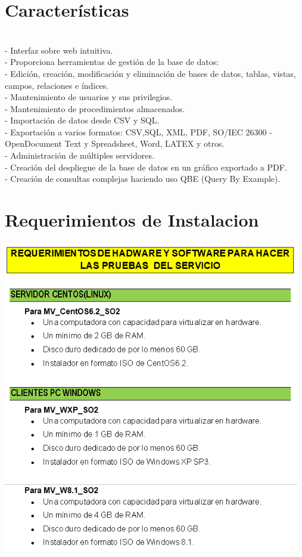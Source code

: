 \section{Características} 
\begin{itemize}
\\- Interfaz sobre web intuitiva.
\\- Proporciona herramientas de gestión de la base de datos:
\\- Edición, creación, modificación y eliminación de bases de datos, tablas, vistas, campos, relaciones e índices.
\\- Mantenimiento de usuarios y sus privilegios.
\\- Mantenimiento de procedimientos almacenados.
\\- Importación de datos desde CSV y SQL.
\\- Exportación a varios formatos: CSV,SQL, XML, PDF, SO/IEC 26300 - OpenDocument Text y Spreadsheet, Word, LATEX y otros.
\\- Administración de múltiples servidores.
\\- Creación del despliegue de la base de datos en un gráfico exportado a PDF.
\\- Creación de consultas complejas haciendo uso QBE (Query By Example).
\\

\end{itemize} 

\section{Requerimientos de Instalacion} 

        \begin{center}
		\includegraphics[width=13cm]{./Imagenes/b}
		\end{center}
		
